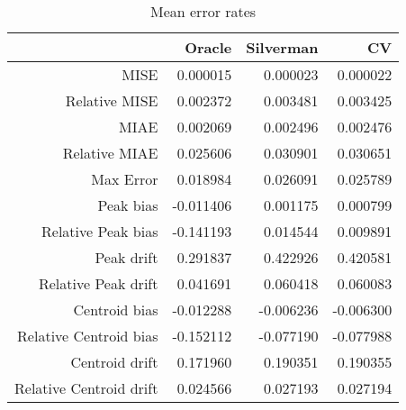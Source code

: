 \begin{table}[ht]
\centering
\begin{tabular}{rrrr}
  \hline
 & Oracle & Silverman & CV \\ 
  \hline
MISE & 0.000015 & 0.000023 & 0.000022 \\ 
  Relative MISE & 0.002372 & 0.003481 & 0.003425 \\ 
  MIAE & 0.002069 & 0.002496 & 0.002476 \\ 
  Relative MIAE & 0.025606 & 0.030901 & 0.030651 \\ 
  Max Error & 0.018984 & 0.026091 & 0.025789 \\ 
  Peak bias & -0.011406 & 0.001175 & 0.000799 \\ 
  Relative Peak bias & -0.141193 & 0.014544 & 0.009891 \\ 
  Peak drift & 0.291837 & 0.422926 & 0.420581 \\ 
  Relative Peak drift & 0.041691 & 0.060418 & 0.060083 \\ 
  Centroid bias & -0.012288 & -0.006236 & -0.006300 \\ 
  Relative Centroid bias & -0.152112 & -0.077190 & -0.077988 \\ 
  Centroid drift & 0.171960 & 0.190351 & 0.190355 \\ 
  Relative Centroid drift & 0.024566 & 0.027193 & 0.027194 \\ 
   \hline
\end{tabular}
\caption{Mean error rates} 
\label{tbl:mean_error_rates}
\end{table}
